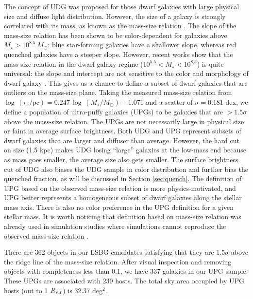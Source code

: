 \documentclass[twocolumn,astrosymb,twocolappendix]{aastex631}
\begin{document}
\begin{CJK*}{UTF8}{gbsn}
\vspace{1em}

The concept of UDG was proposed for those dwarf galaxies with large physical size and diffuse light distribution. However, the size of a galaxy is strongly correlated with its mass, as known as the mass-size relation \citep[e.g.,][]{Lange2015}. The slope of the mass-size relation has been shown to be color-dependent for galaxies above $M_\star > 10^{8.5}\ M_\odot$: blue star-forming galaxies have a shallower slope, whereas red quenched galaxies have a steeper slope. However, recent works show that the mass-size relation in the dwarf galaxy regime ($10^{5.5} < M_\star < 10^{8.5}$) is quite universal: the slope and intercept are not sensitive to the color and morphology of dwarf galaxy \citep{ELVES-I}. This gives us a chance to define a subset of dwarf galaxies that are outliers on the mass-size plane. Taking the measured mass-size relation from \citet{ELVES-I} $\log\, (r_e/\mathrm{pc}) = 0.247\, \log\, (M_\star/M_\odot) + 1.071$ and a scatter of $\sigma=0.181$ dex, we define a population of ultra-puffy galaxies (UPGs) to be galaxies that are $>1.5\sigma$ above the mass-size relation. The UPGs are not necessarily large in physical size or faint in average surface brightness. Both UDG and UPG represent subsets of dwarf galaxies that are larger and diffuser than average. However, the hard cut on size (1.5 kpc) makes UDG losing ``large'' galaxies at the low-mass end because as mass goes smaller, the average size also gets smaller. The surface brightness cut of UDG also biases the UDG sample in color distribution and further bias the quenched fraction, as will be discussed in Section \ref{sec:quench}. The definition of UPG based on the observed mass-size relation is more physics-motivated, and UPG better represents a homogeneous subset of dwarf galaxies along the stellar mass axis. There is also no color preference in the UPG definition for a given stellar mass. It is worth noticing that definition based on mass-size relation was already used in simulation studies where simulations cannot reproduce the observed mass-size relation \citep[e.g.,][]{Benavides2021}.

There are 362 objects in our LSBG candidates satisfying that they are $1.5\sigma$ above the ridge line of the mass-size relation. After visual inspection and removing objects with completeness less than 0.1, we have 337 galaxies in our UPG sample. These UPGs are associated with 239 hosts. The total sky area occupied by UPG hosts (out to 1 $R_{\rm{vir}}$) is 32.37 deg$^{2}$.



\end{CJK*}
\end{document}
